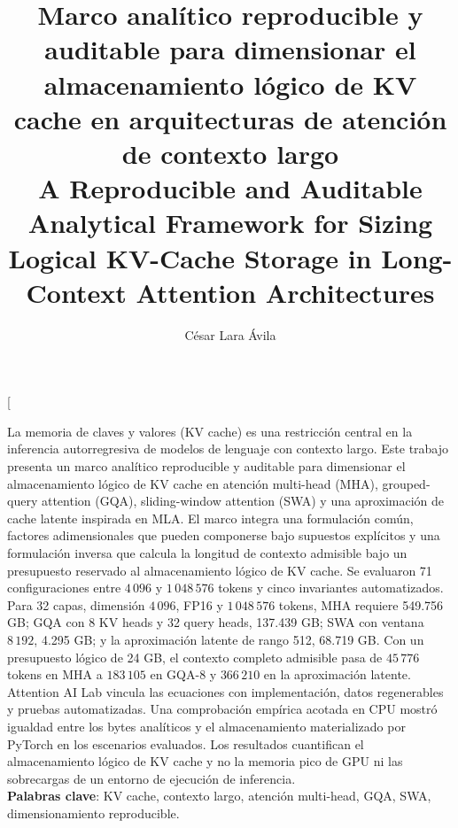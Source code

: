 \documentclass[a4paper,twocolumn]{article}
\title{Marco analítico reproducible y auditable para dimensionar el almacenamiento lógico de KV cache en arquitecturas de atención de contexto largo\\[2ex]
A Reproducible and Auditable Analytical Framework for Sizing Logical KV-Cache Storage in Long-Context Attention Architectures}
\author[1,\orcidlink{0009-0003-8564-615X},*]{César Lara Ávila}
\affil[1]{Facultad de Ciencias, Universidad Nacional de Ingeniería, Av. Túpac Amaru 210, Rímac, Lima 15333, Perú}
\affil[*]{Autor de correspondencia: César Lara Ávila (claraa@uni.edu.pe)}
\date{}
\begin{document}
\twocolumn[\maketitle
\begin{onecolabstract}
La memoria de claves y valores (KV cache) es una restricción central en la inferencia autorregresiva de modelos de lenguaje con contexto largo. Este trabajo presenta un marco analítico reproducible y auditable para dimensionar el almacenamiento lógico de KV cache en atención multi-head (MHA), grouped-query attention (GQA), sliding-window attention (SWA) y una aproximación de cache latente inspirada en MLA. El marco integra una formulación común, factores adimensionales que pueden componerse bajo supuestos explícitos y una formulación inversa que calcula la longitud de contexto admisible bajo un presupuesto reservado al almacenamiento lógico de KV cache. Se evaluaron 71 configuraciones entre $4\,096$ y $1\,048\,576$ tokens y cinco invariantes automatizados. Para 32 capas, dimensión $4\,096$, FP16 y $1\,048\,576$ tokens, MHA requiere 549.756 GB; GQA con 8 KV heads y 32 query heads, 137.439 GB; SWA con ventana $8\,192$, 4.295 GB; y la aproximación latente de rango 512, 68.719 GB. Con un presupuesto lógico de 24 GB, el contexto completo admisible pasa de $45\,776$ tokens en MHA a $183\,105$ en GQA-8 y $366\,210$ en la aproximación latente. Attention AI Lab vincula las ecuaciones con implementación, datos regenerables y pruebas automatizadas. Una comprobación empírica acotada en CPU mostró igualdad entre los bytes analíticos y el almacenamiento materializado por PyTorch en los escenarios evaluados. Los resultados cuantifican el almacenamiento lógico de KV cache y no la memoria pico de GPU ni las sobrecargas de un entorno de ejecución de inferencia.\\

\noindent\textbf{Palabras clave}: KV cache, contexto largo, atención multi-head, GQA, SWA, dimensionamiento reproducible.
\vspace{3ex}
\end{onecolabstract}
\renewcommand{\abstractname}{Abstract}
\end{document}
